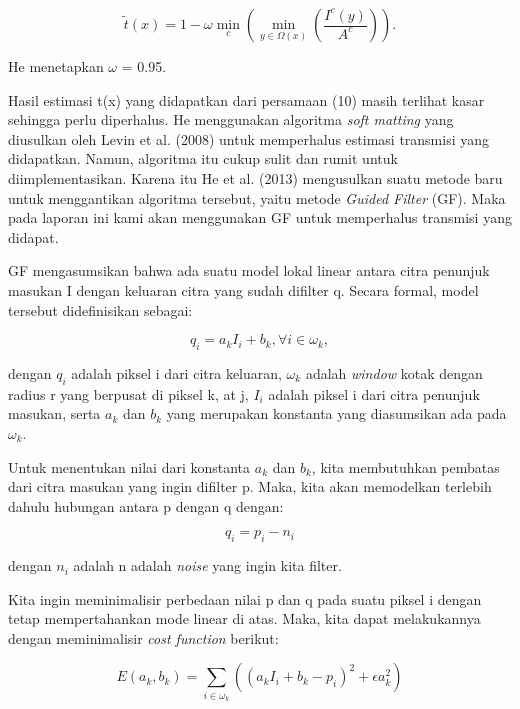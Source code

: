 \documentclass[11pt, a4paper, final]{report}
\begin{document}
\begin{equation} \label{eq10}
\tilde{t}(x)=1-\omega\min_c{(\min_{y\in{\Omega(x)}}{(\dfrac{I^c(y)}{A^c})})}.
\end{equation}

He menetapkan $\omega$ = 0.95.

Hasil estimasi t(x) yang didapatkan dari persamaan (10) masih terlihat kasar sehingga perlu diperhalus. He menggunakan algoritma \textit{soft matting} yang diusulkan oleh Levin et al. (2008) untuk memperhalus estimasi transmisi yang didapatkan. Namun, algoritma itu cukup sulit dan rumit untuk diimplementasikan. Karena itu He et al. (2013) mengusulkan suatu metode baru untuk menggantikan algoritma tersebut, yaitu metode \textit{Guided Filter} (GF). Maka pada laporan ini kami akan menggunakan GF  untuk memperhalus transmisi yang didapat.

GF mengasumsikan bahwa ada suatu model lokal linear antara citra penunjuk masukan I dengan keluaran citra yang sudah difilter q. Secara formal, model tersebut didefinisikan sebagai:

\begin{equation} \label{eq11}
q_i=a_kI_i+b_k,\forall{i}\in{\omega_k},
\end{equation}

dengan $q_i$ adalah piksel i dari citra keluaran, $\omega_k$ adalah \textit{window} kotak dengan radius r yang berpusat di piksel k, at  j, $I_i$ adalah piksel i dari citra penunjuk masukan, serta $a_k$ dan $b_k$ yang merupakan konstanta yang diasumsikan ada pada $\omega_k$.

Untuk menentukan nilai dari konstanta $a_k$ dan $b_k$, kita membutuhkan pembatas dari citra masukan yang ingin difilter p. Maka, kita akan memodelkan terlebih dahulu hubungan antara p dengan q dengan:

\begin{equation} \label{eq12}
q_i = p_i - n_i
\end{equation}

dengan $n_i$ adalah n adalah \textit{noise} yang ingin kita filter.

Kita ingin meminimalisir perbedaan nilai p dan q pada suatu piksel i dengan tetap mempertahankan mode linear di atas. Maka, kita dapat melakukannya dengan meminimalisir \textit{cost function} berikut:



\begin{equation} \label{eq13}
E(a_k,b_k)=\sum_{i\in{\omega_k}}{((a_kI_i+b_k-p_i)^2+\epsilon{a_k^2})}
\end{equation}
\end{document}
